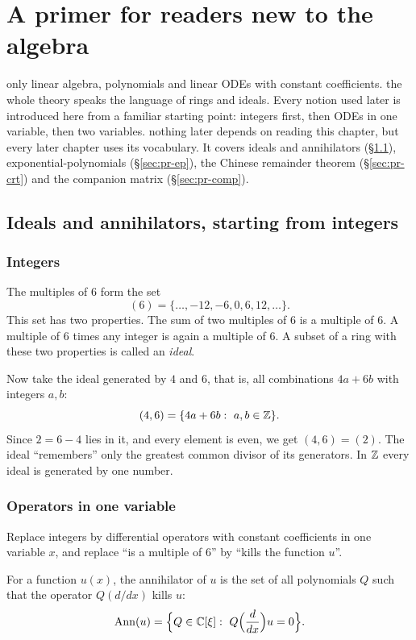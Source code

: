 \section{A primer for readers new to the algebra}\label{ch:primer}
\sectionbrief
{only linear algebra, polynomials and linear ODEs with constant coefficients.}
{the whole theory speaks the language of rings and ideals. Every notion used later is introduced here from a familiar starting point: integers first, then ODEs in one variable, then two variables.}
{nothing later depends on reading this chapter, but every later chapter uses its vocabulary. It covers ideals and annihilators (\S\ref{sec:pr-ideal}), exponential-polynomials (\S\ref{sec:pr-ep}), the Chinese remainder theorem (\S\ref{sec:pr-crt}) and the companion matrix (\S\ref{sec:pr-comp}).}

\subsection{Ideals and annihilators, starting from integers}\label{sec:pr-ideal}

\subsubsection{Integers}

The multiples of $6$ form the set
\[
(6)=\{\dots,-12,-6,0,6,12,\dots\}.
\]
This set has two properties. The sum of two multiples of $6$ is a multiple of $6$. A multiple of $6$ times any integer is again a multiple of $6$. A subset of a ring with these two properties is called an \emph{ideal}.

Now take the ideal generated by $4$ and $6$, that is, all combinations $4a+6b$ with integers $a,b$:
\[
(4,6)=\{4a+6b:\ a,b\in\mathbb{Z}\}.
\]
Since $2=6-4$ lies in it, and every element is even, we get $(4,6)=(2)$. The ideal ``remembers'' only the greatest common divisor of its generators. In $\mathbb{Z}$ every ideal is generated by one number.

\subsubsection{Operators in one variable}

Replace integers by differential operators with constant coefficients in one variable $x$, and replace ``is a multiple of $6$'' by ``kills the function $u$''.

\begin{definition}
For a function $u(x)$, the annihilator of $u$ is the set of all polynomials $Q$ such that the operator $Q(d/dx)$ kills $u$:
\[
\Ann(u)=\Big\{Q\in\C[\xi]:\ Q\Big(\frac{d}{dx}\Big)u=0\Big\}.
\]
\end{definition}


